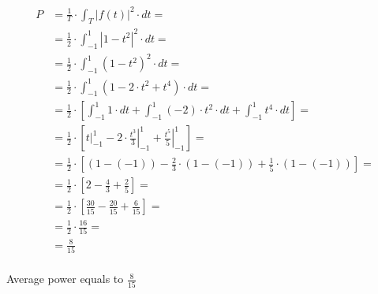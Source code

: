 \begin{task}
\begin{align*}
	P&=\frac{1}{T} \cdot \int_{T}\left|f(t)\right|^2 \cdot dt =\\
	&=\frac{1}{2} \cdot  \int_{-1}^{1}\left| 1-t^2 \right|^2 \cdot dt =\\
    &=\frac{1}{2} \cdot  \int_{-1}^{1}\left(1-t^2\right)^2 \cdot dt =\\
    &=\frac{1}{2} \cdot  \int_{-1}^{1}\left(1-2 \cdot t^2 + t^4\right) \cdot dt =\\
    &=\frac{1}{2} \cdot \left[ \int_{-1}^{1} 1 \cdot dt +\int_{-1}^{1} (-2) \cdot t^2 \cdot dt +\int_{-1}^{1} t^4 \cdot dt\right]=\\
    &=\frac{1}{2} \cdot \left[ \left. t \right|_{-1}^{1} -2 \cdot \left. \frac{t^3}{3}\right|_{-1}^{1} +\left. \frac{t^5}{5}\right|_{-1}^{1}\right]=\\
    &=\frac{1}{2} \cdot \left[ (1-(-1)) -\frac{2}{3} \cdot (1-(-1)) +\frac{1}{5} \cdot (1-(-1))\right]=\\
    &=\frac{1}{2} \cdot \left[ 2 -\frac{4}{3} +\frac{2}{5}\right]=\\
    &=\frac{1}{2} \cdot \left[ \frac{30}{15} -\frac{20}{15} +\frac{6}{15}\right]=\\
    &=\frac{1}{2} \cdot \frac{16}{15}=\\
    &=\frac{8}{15}\\
\end{align*}

Average power equals to $\frac{8}{15}$
\end{task}
